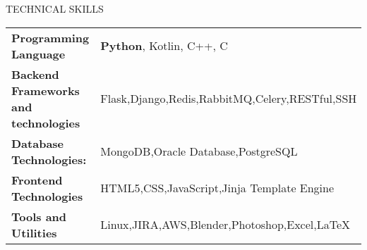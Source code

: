 \documentclass{resume} %
\makeatletter
\newcommand{\entry}[2]{#1 & #2 \tabularnewline} %
\newcommand{\tableEnv}[2]{%
  \begin{rSection}{#1} %
    \begin{adjustwidth}{0.0in}{0.1in} %
      \begin{tabularx}{\linewidth}{@{} >{\bfseries}l @{\hspace{6ex}} X @{}}
        #2 %
      \end{tabularx}
    \end{adjustwidth}
  \end{rSection}
}
\makeatother
\begin{document}


\tableEnv{TECHNICAL SKILLS}{
    \entry{Programming Language}{\textbf{Python}, Kotlin, C++, C}
    \entry{Backend Frameworks and technologies}{Flask,Django,Redis,RabbitMQ,Celery,RESTful,SSH}
    \entry{Database Technologies:}{MongoDB,Oracle Database,PostgreSQL}
    \entry{Frontend Technologies}{HTML5,CSS,JavaScript,Jinja Template Engine}
      \entry{Tools and Utilities}{Linux,JIRA,AWS,Blender,Photoshop,Excel,LaTeX }
}

\end{document}
